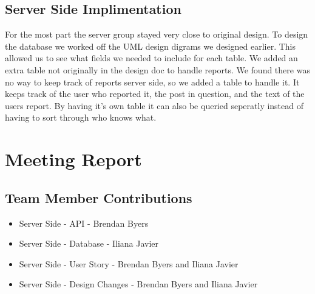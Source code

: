 \documentclass[12pt]{article}
\begin{document}
\subsection{Server Side Implimentation}
For the most part the server group stayed very close to original design.  To design the database we worked off the UML design digrams we designed earlier.  This allowed us to see what fields we needed to include for each table.  We added an extra table not originally in the design doc to handle reports.  We found there was no way to keep track of reports server side, so we added a table to handle it.  It keeps track of the user who reported it, the post in question, and the text of the users report.  By having it's own table it can also be queried seperatly instead of having to sort through who knows what.
\section{Meeting Report}

\subsection{Team Member Contributions}
\begin{itemize}
      \item Server Side - API - Brendan Byers
      \item Server Side - Database - Iliana Javier
      \item Server Side - User Story - Brendan Byers and Iliana Javier
      \item Server Side - Design Changes - Brendan Byers and Iliana Javier
\end{itemize}
\end{document}
